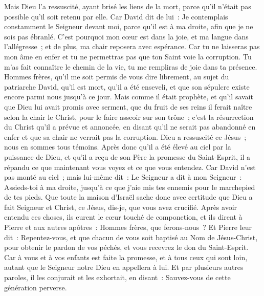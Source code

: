 \begin{multicols}{2}
Mais Dieu l'a ressuscité, ayant brisé les liens de la mort, parce qu'il n'était pas possible qu'il soit retenu par elle.
Car David dit de lui~: Je contemplais constamment le Seigneur devant moi, parce qu'il est à ma droite, afin que je ne sois pas ébranlé.
C'est pourquoi mon cœur est dans la joie, et ma langue dans l'allégresse~; et de plus, ma chair reposera avec espérance.
Car tu ne laisseras pas mon âme en enfer et tu ne permettras pas que ton Saint voie la corruption.
Tu m'as fait connaître le chemin de la vie, tu me rempliras de joie dans ta présence.
Hommes frères, qu'il me soit permis de vous dire librement, au sujet du patriarche David, qu'il est mort, qu'il a été enseveli, et que son sépulcre existe encore parmi nous jusqu'à ce jour.
Mais comme il était prophète, et qu'il savait que Dieu lui avait promis avec serment, que du fruit de ses reins il ferait naître selon la chair le Christ, pour le faire asseoir sur son trône~;
c'est la résurrection du Christ qu'il a prévue et annoncée, en disant qu'il ne serait pas abandonné en enfer et que sa chair ne verrait pas la corruption.
Dieu a ressuscité ce Jésus~; nous en sommes tous témoins.
Après donc qu'il a été élevé au ciel par la puissance de Dieu, et qu'il a reçu de son Père la promesse du Saint-Esprit, il a répandu ce que maintenant vous voyez et ce que vous entendez.
Car David n'est pas monté au ciel~; mais lui-même dit~: Le Seigneur a dit à mon Seigneur~: Assieds-toi à ma droite,
jusqu'à ce que j'aie mis tes ennemis pour le marchepied de tes pieds.
Que toute la maison d'Israël sache donc avec certitude que Dieu a fait Seigneur et Christ, ce Jésus, dis-je, que vous avez crucifié.
Après avoir entendu ces choses, ils eurent le cœur touché de componction, et ils dirent à Pierre et aux autres apôtres~: Hommes frères, que ferons-nous~?
Et Pierre leur dit~: Repentez-vous, et que chacun de vous soit baptisé au Nom de Jésus-Christ, pour obtenir le pardon de vos péchés, et vous recevrez le don du Saint-Esprit.
Car à vous et à vos enfants est faite la promesse, et à tous ceux qui sont loin, autant que le Seigneur notre Dieu en appellera à lui.
Et par plusieurs autres paroles, il les conjurait et les exhortait, en disant~: Sauvez-vous de cette génération perverse.

\end{multicols}
